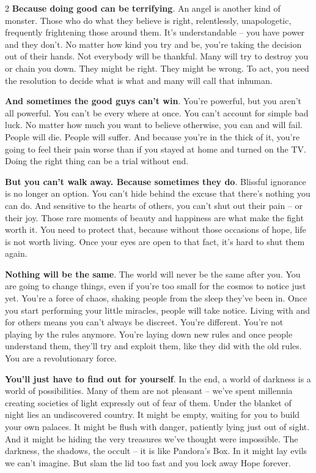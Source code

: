 \begin{multicols}{2}
\textbf{Because doing good can be terrifying}. An angel is another kind of monster. Those who do what they believe is right, relentlessly, unapologetic, frequently frightening those around them. It's understandable -- you have power and they don't. No matter how kind you try and be, you're taking the decision out of their hands. Not everybody will be thankful. Many will try to destroy you or chain you down. They might be right. They might be wrong. To act, you need the resolution to decide what is what and many will call that inhuman.

\textbf{And sometimes the good guys can't win}. You're powerful, but you aren't all powerful. You can't be every where at once. You can't account for simple bad luck. No matter how much you want to believe otherwise, you can and will fail. People will die. People will suffer. And because you're in the thick of it, you're going to feel their pain worse than if you stayed at home and turned on the TV. Doing the right thing can be a trial without end.

\textbf{But you can't walk away. Because sometimes they do}. Blissful ignorance is no longer an option. You can't hide behind the excuse that there's nothing you can do. And sensitive to the hearts of others, you can't shut out their pain -- or their joy. Those rare moments of beauty and happiness are what make the fight worth it. You need to protect that, because without those occasions of hope, life is not worth living. Once your eyes are open to that fact, it's hard to shut them again.

\textbf{Nothing will be the same}. The world will never be the same after you. You are going to change things, even if you're too small for the cosmos to notice just yet. You're a force of chaos, shaking people from the sleep they've been in. Once you start performing your little miracles, people will take notice. Living with and for others means you can't always be discreet. You're different. You're not playing by the rules anymore. You're laying down new rules and once people understand them, they'll try and exploit them, like they did with the old rules. You are a revolutionary force.

\textbf{You'll just have to find out for yourself}. In the end, a world of darkness is a world of possibilities. Many of them are not pleasant -- we've spent millennia creating societies of light expressly out of fear of them. Under the blanket of night lies an undiscovered country. It might be empty, waiting for you to build your own palaces. It might be flush with danger, patiently lying just out of sight. And it might be hiding the very treasures we've thought were impossible. The darkness, the shadows, the occult -- it is like Pandora's Box. In it might lay evils we can't imagine. But slam the lid too fast and you lock away Hope forever.


\end{multicols}
